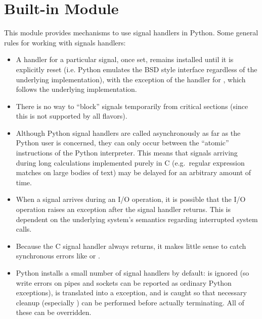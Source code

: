 \section{Built-in Module }

This module provides mechanisms to use signal handlers in Python.
Some general rules for working with signals handlers:

\begin{itemize}

\item
A handler for a particular signal, once set, remains installed until
it is explicitly reset (i.e. Python emulates the BSD style interface
regardless of the underlying implementation), with the exception of
the handler for , which follows the underlying
implementation.

\item
There is no way to ``block'' signals temporarily from critical
sections (since this is not supported by all \UNIX{} flavors).

\item
Although Python signal handlers are called asynchronously as far as
the Python user is concerned, they can only occur between the
``atomic'' instructions of the Python interpreter.  This means that
signals arriving during long calculations implemented purely in C
(e.g.\ regular expression matches on large bodies of text) may be
delayed for an arbitrary amount of time.

\item
When a signal arrives during an I/O operation, it is possible that the
I/O operation raises an exception after the signal handler returns.
This is dependent on the underlying \UNIX{} system's semantics regarding
interrupted system calls.

\item
Because the C signal handler always returns, it makes little sense to
catch synchronous errors like  or .

\item
Python installs a small number of signal handlers by default:
 is ignored (so write errors on pipes and sockets can be
reported as ordinary Python exceptions),  is translated
into a  exception, and  is
caught so that necessary cleanup (especially ) can
be performed before actually terminating.  All of these can be
overridden.


\end{itemize}
